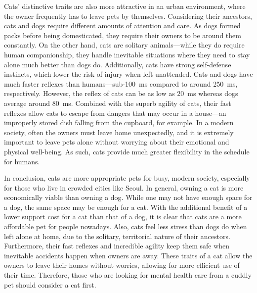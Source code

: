 \documentclass{tls1004}
\begin{document}
Cats' distinctive traits are also more attractive in an urban environment, where the owner frequently has to leave pets by themselves.
Considering their ancestors, cats and dogs require different amounts of attention and care.
As dogs formed packs before being domesticated, they require their owners to be around them constantly.
On the other hand, cats are solitary animals---while they do require human companionship, they handle inevitable situations where they need to stay alone much better than dogs do.
Additionally, cats have strong self-defense instincts, which lower the risk of injury when left unattended.
Cats and dogs have much faster reflexes than humans---sub-\SI{100}{\ms} compared to around \SI{250}{\ms}, respectively.
However, the reflex of cats can be as low as \SI{20}{\ms} whereas dogs average around \SI{80}{\ms}.
Combined with the superb agility of cats, their fast reflexes allow cats to escape from dangers that may occur in a house---an improperly stored dish falling from the cupboard, for example.
In a modern society, often the owners must leave home unexpectedly, and it is extremely important to leave pets alone without worrying about their emotional and physical well-being.
As such, cats provide much greater flexibility in the schedule for humans.

In conclusion, cats are more appropriate pets for busy, modern society, especially for those who live in crowded cities like Seoul.
In general, owning a cat is more economically viable than owning a dog.
While one may not have enough space for a dog, the same space may be enough for a cat.
With the additional benefit of a lower support cost for a cat than that of a dog, it is clear that cats are a more affordable pet for people nowadays.
Also, cats feel less stress than dogs do when left alone at home, due to the solitary, territorial nature of their ancestors.
Furthermore, their fast reflexes and incredible agility keep them safe when inevitable accidents happen when owners are away.
These traits of a cat allow the owners to leave their homes without worries, allowing for more efficient use of their time.
Therefore, those who are looking for mental health care from a cuddly pet should consider a cat first.
\end{document}
